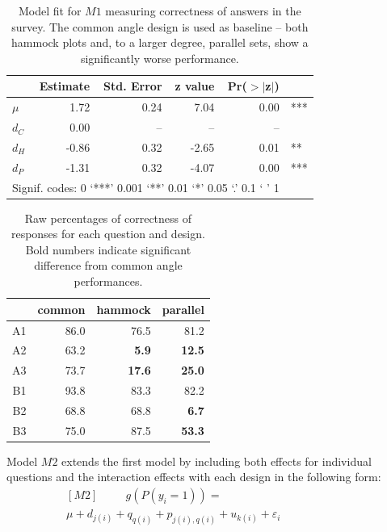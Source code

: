 \begin{table}[ht]
\begin{center}
\begin{tabular}{lrrrrl}
  \hline
 & Estimate & Std. Error & z value & Pr($>$$|$z$|$) & \\ 
  \hline
$\mu$ & 1.72 & 0.24 & 7.04 & 0.00 & ***\\ [5pt]
  $d_C$& 0.00 & -- & -- & -- \\ 
  $d_H$ & -0.86 & 0.32 & -2.65 & 0.01 & ** \\ 
  $d_P$ & -1.31 & 0.32 & -4.07 & 0.00 & ***\\ 
   \hline
\multicolumn{5}{l}{Signif. codes:  0 `***' 0.001 `**' 0.01 `*' 0.05 `.' 0.1 ` ' 1 }
\end{tabular}
\end{center}
\caption{\label{coef1} Model fit for $M1$ measuring correctness of answers in the survey. The common angle design is used as baseline -- both hammock plots and, to a larger degree, parallel sets, show a significantly worse performance. }
\end{table}


\begin{table}[ht]
\begin{center}
\begin{tabular}{rrrr}
  \hline
 & common & hammock & parallel \\ 
  \hline
 A1 & 86.0 & 76.5 & 81.2 \\ 
  A2 & 63.2 & {\bf 5.9} & {\bf 12.5} \\ 
  A3 & 73.7 & {\bf 17.6} & {\bf 25.0} \\ 
  B1 & 93.8 & 83.3 & 82.2 \\ 
  B2 & 68.8 & 68.8 & {\bf 6.7} \\ 
  B3 & 75.0 & 87.5 & {\bf 53.3} \\
   \hline
\end{tabular}
\end{center}
\caption{\label{raw} Raw percentages of correctness of responses for each question and design. Bold numbers indicate significant difference from common angle performances. }
\end{table}

Model $M2$ extends the first model by including both  effects for individual questions and the interaction effects with each design in the following form:
\begin{eqnarray}\nonumber
[M2]  \ \ \qquad g(P(y_i=1)) =  \qquad\qquad\qquad\qquad\qquad&&\\ \label{m2}
\mu + d_{j(i)}  + q_{q(i)} + p_{j(i),q(i)} + u_{k(i)} + \varepsilon_i 
\end{eqnarray}

